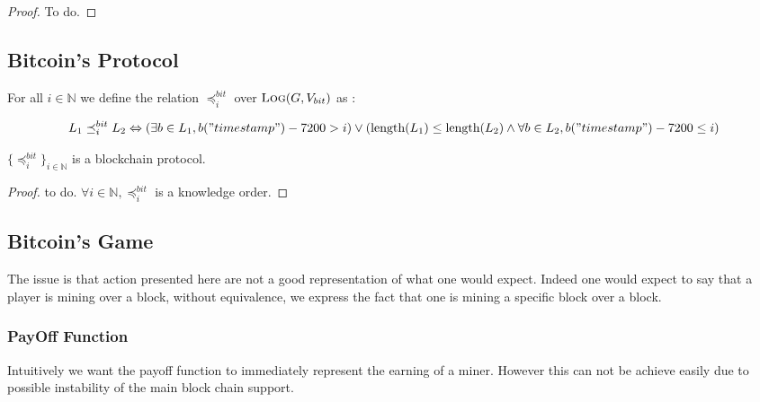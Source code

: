 \begin{proof}
	To do.
\end{proof}

\subsection{Bitcoin's Protocol}

For all $i \in \mathbb{N}$ we define the relation $\preceq^{bit}_i$ over $\text{\sc Log}(G,V_{bit})$ as : 

$$ L_1 \preceq^{bit}_i L_2  \Leftrightarrow \left ( \exists b \in L_1, b("timestamp") - 7200 > i \right ) \lor \left ( \text{\rm length}(L_1) \leq \text{\rm length}(L_2) \land \forall b \in L_2, b("timestamp") - 7200 \leq i \right )$$

\begin{myprop}
	$\{\preceq^{bit}_i\}_{i\in\mathbb{N}}$ is a blockchain protocol.
\end{myprop}

\begin{proof}
	to do.
	$\forall i\in \mathbb{N}, \preceq^{bit}_i$ is a knowledge order.
\end{proof}

\subsection{Bitcoin's Game}

The issue is that action presented here are not a good representation of what one would expect. Indeed one would expect to say that a player is mining over a block, without equivalence, we express the fact that one is mining a specific block over a block.


\subsubsection{PayOff Function}
Intuitively we want the payoff function to immediately represent the earning of a miner. However this can not be achieve easily due to possible instability of the main block chain support. 

